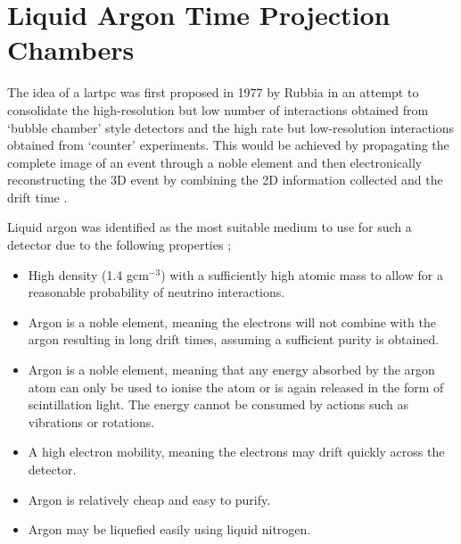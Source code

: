 \section{Liquid Argon Time Projection Chambers}\label{sec:lartpc}

The idea of a \gls{lartpc} was first proposed in 1977 by Rubbia in an attempt to consolidate the high-resolution but low number of interactions obtained from `bubble chamber' style detectors and the high rate but low-resolution interactions obtained from `counter' experiments. This would be achieved by propagating the complete image of an event through a noble element and then electronically reconstructing the 3D event by combining the 2D information collected and the drift time \cite{LArTPC_proposal}.

Liquid argon was identified as the most suitable medium to use for such a detector due to the following properties \cite{LArTPC_proposal}; 
\begin{itemize}
    \item High density (1.4 gcm$^{-3}$) with a sufficiently high atomic mass to allow for a reasonable probability of neutrino interactions.
    \item Argon is a noble element, meaning the electrons will not combine with the argon resulting in long drift times, assuming a sufficient purity is obtained.
    \item Argon is a noble element, meaning that any energy absorbed by the argon atom can only be used to ionise the atom or is again released in the form of scintillation light. The energy cannot be consumed by actions such as vibrations or rotations. 
    \item A high electron mobility, meaning the electrons may drift quickly across the detector.
    \item Argon is relatively cheap and easy to purify.
    \item Argon may be liquefied easily using liquid nitrogen. 
\end{itemize}

